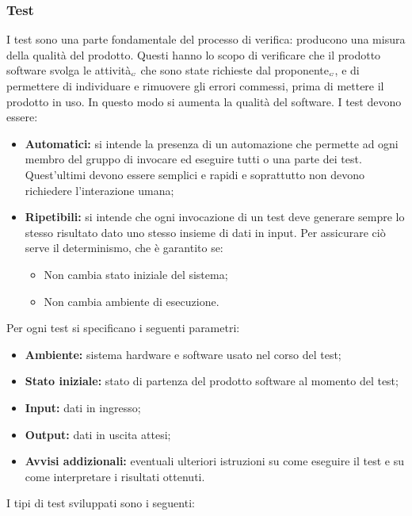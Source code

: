 \subsubsection{Test} \label{ProcessiDiSupportoVerificaAttivitàTest}
I test sono una parte fondamentale del processo di verifica: producono una misura della qualità del prodotto. Questi hanno lo scopo di verificare che il prodotto software svolga le attività$_{\scaleto{G}{3pt}}$ che sono state richieste dal proponente$_{\scaleto{G}{3pt}}$, e di permettere di individuare e rimuovere gli errori  commessi, prima di mettere il prodotto in uso. In questo modo si aumenta la qualità del software. 
I test devono essere:
\begin{itemize}
	\item \textbf{Automatici:} si intende la presenza di un automazione che permette ad ogni membro del gruppo di invocare ed eseguire tutti o una parte dei test. Quest’ultimi devono essere semplici e rapidi e soprattutto non devono richiedere l’interazione umana; 
	\item \textbf{Ripetibili:} si intende che ogni invocazione di un test deve generare sempre lo stesso risultato dato uno stesso insieme di dati in input. Per assicurare ciò serve il determinismo, che è garantito se:
	\begin{itemize}
		\item Non cambia stato iniziale del sistema;
		\item Non cambia ambiente di esecuzione.
	\end{itemize}
\end{itemize}
Per ogni test si specificano i seguenti parametri:
\begin{itemize}
	\item \textbf{Ambiente:} sistema hardware e software usato nel corso del test;
	\item \textbf{Stato iniziale:} stato di partenza del prodotto software al momento del test;
	\item \textbf{Input:} dati in ingresso;
	\item \textbf{Output:} dati in uscita attesi;
	\item \textbf{Avvisi addizionali:} eventuali ulteriori istruzioni su come eseguire il test e su come interpretare i risultati ottenuti.
\end{itemize}
I tipi di test sviluppati sono i seguenti:  
